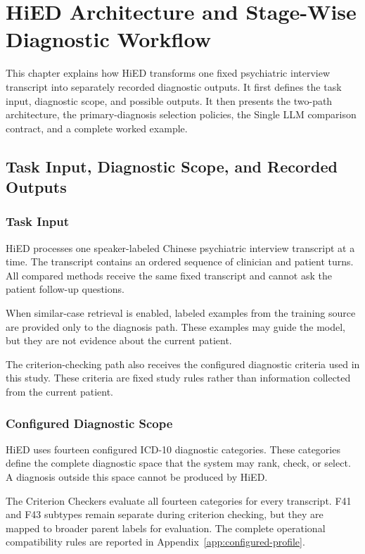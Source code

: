 \chapter{HiED Architecture and Stage-Wise Diagnostic Workflow}
\label{ch:architecture}

This chapter explains how HiED transforms one fixed psychiatric interview transcript into separately recorded diagnostic outputs. It first defines the task input, diagnostic scope, and possible outputs. It then presents the two-path architecture, the primary-diagnosis selection policies, the Single LLM comparison contract, and a complete worked example.

\section{Task Input, Diagnostic Scope, and Recorded Outputs}
\label{sec:input-diagnostic-scope}

\subsection{Task Input}

HiED processes one speaker-labeled Chinese psychiatric interview transcript at a time. The transcript contains an ordered sequence of clinician and patient turns. All compared methods receive the same fixed transcript and cannot ask the patient follow-up questions.

When similar-case retrieval is enabled, labeled examples from the training source are provided only to the diagnosis path. These examples may guide the model, but they are not evidence about the current patient.

The criterion-checking path also receives the configured diagnostic criteria used in this study. These criteria are fixed study rules rather than information collected from the current patient.

\subsection{Configured Diagnostic Scope}

HiED uses fourteen configured ICD-10 diagnostic categories. These categories define the complete diagnostic space that the system may rank, check, or select. A diagnosis outside this space cannot be produced by HiED.

The Criterion Checkers evaluate all fourteen categories for every transcript. F41 and F43 subtypes remain separate during criterion checking, but they are mapped to broader parent labels for evaluation. The complete operational compatibility rules are reported in Appendix~\ref{app:configured-profile}.

